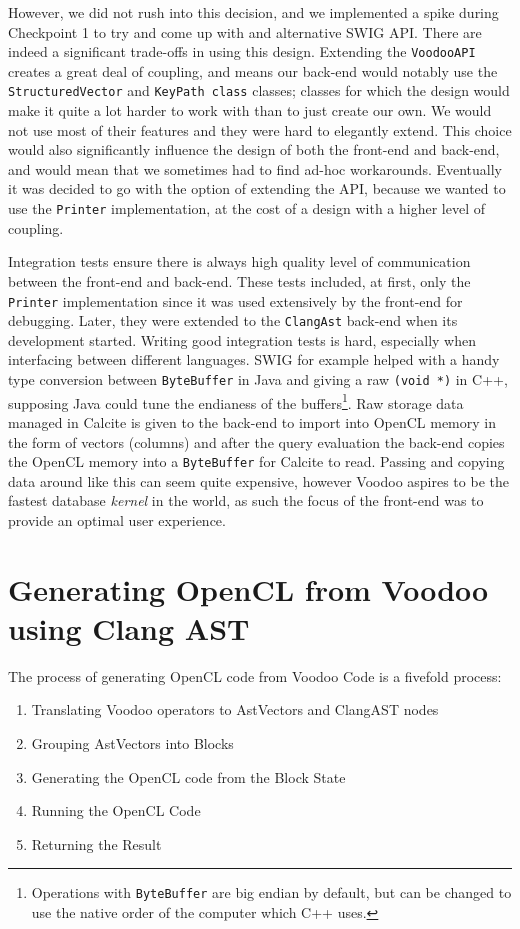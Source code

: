However, we did not rush into this decision, and we implemented a spike during Checkpoint 1 to try and come up with and alternative SWIG API. There are indeed a significant trade-offs in using this design. Extending the \texttt{VoodooAPI} creates a great deal of coupling, and means our back-end would notably use the \texttt{StructuredVector} and \texttt{KeyPath class} classes; classes for which the design would make it quite a lot harder to work with than to just create our own. We would not use most of their features and they were hard to elegantly extend. This choice would also significantly influence the design of both the front-end and back-end, and would mean that we sometimes had to find ad-hoc workarounds. Eventually it was decided to go with the option of extending the API, because we wanted to use the \texttt{Printer} implementation, at the cost of a design with a higher level of coupling.

Integration tests ensure there is always high quality level of communication between the front-end and back-end. These tests included, at first, only the \texttt{Printer} implementation since it was used extensively by the front-end for debugging. Later, they were extended to the \texttt{ClangAst} back-end when its development started. Writing good integration tests is hard, especially when interfacing between different languages. SWIG for example helped with a handy type conversion between \texttt{ByteBuffer} in Java and giving a raw \texttt{(void *)} in C++, supposing Java could tune the endianess of the buffers\footnote{Operations with \texttt{ByteBuffer} are big endian by default, but can be changed to use the native order of the computer which C++ uses.}. Raw storage data managed in Calcite is given to the back-end to import into OpenCL memory in the form of vectors (columns) and after the query evaluation the back-end copies the OpenCL memory into a \texttt{ByteBuffer} for Calcite to read. Passing and copying data around like this can seem quite expensive, however Voodoo aspires to be the fastest database \emph{kernel} in the world, as such the focus of the front-end was to provide an optimal user experience.

\section{Generating OpenCL from Voodoo using Clang AST}
\label{section:voodoo-to-opencl}

The process of generating OpenCL code from Voodoo Code is a fivefold process:
\begin{enumerate}
    \item Translating Voodoo operators to AstVectors and ClangAST nodes
    \item Grouping AstVectors into Blocks
    \item Generating the OpenCL code from the Block State
    \item Running the OpenCL Code
    \item Returning the Result
\end{enumerate}


